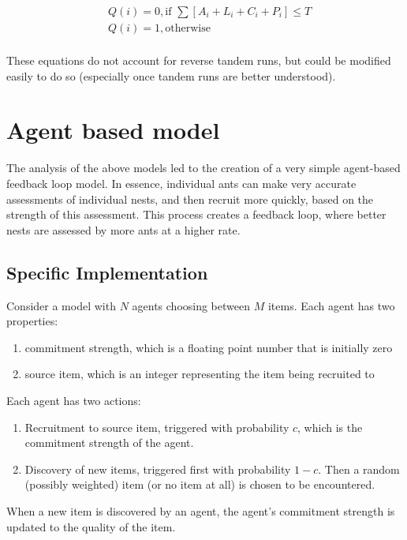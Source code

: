 \documentclass[letterpaper]{article}
\begin{document}
\begin{equation}
\begin{aligned}
  & Q(i) = 0, \text{if    } \sum [A_i + L_i + C_i + P_i] \leq T \\
  & Q(i) = 1, \text{otherwise} \\
\end{aligned}
\end{equation}

These equations do not account for reverse tandem runs, but could be modified easily to do so (especially once tandem runs are better understood).



\section{Agent based model}

The analysis of the above models led to the creation of a very simple agent-based feedback loop model.
In essence, individual ants can make very accurate assessments of individual nests, and then recruit more quickly, based on the strength of this assessment.
This process creates a feedback loop, where better nests are assessed by more ants at a higher rate.

\subsection{Specific Implementation}
Consider a model with $N$ agents choosing between $M$ items.
Each agent has two properties:
\begin{enumerate}
    \item commitment strength, which is a floating point number that is initially zero
    \item source item, which is an integer representing the item being recruited to
\end{enumerate}
Each agent has two actions:
\begin{enumerate}
    \item Recruitment to source item, triggered with probability $c$, which is the commitment strength of the agent.
    \item Discovery of new items, triggered first with probability $1 - c$. Then a random (possibly weighted) item (or no item at all) is chosen to be encountered.
\end{enumerate}
When a new item is discovered by an agent, the agent's commitment strength is updated to the quality of the item.
\end{document}
